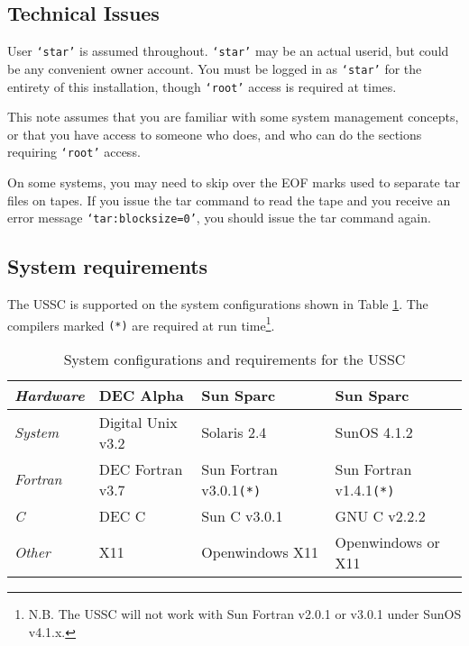 \subsection{Technical Issues}
\label{s:intro:techi}

User {\tt {\tt `star'}} is assumed throughout. {\tt `star'} may be an
actual userid, but could be any convenient owner account.  You must be
logged in as {\tt `star'} for the entirety of this installation, though
{\tt `root'} access is required at times.

This note assumes that you are familiar with some system management concepts,
or that you have access to someone who does, and who can do the sections 
requiring {\tt `root'} access.

On some systems, you may need to skip over the EOF marks used to separate
tar files on tapes.  If you issue the tar command to read the tape and
you receive an error message {\tt `tar:blocksize=0'}, you should issue
the tar command again.

\subsection{System requirements}
\label{s:intro:reqs}

The USSC is supported on the system configurations shown in Table
\ref{t:reqs}. The compilers marked {\tt (*)} are required at run
time\footnote{N.B. The USSC will not work with Sun Fortran
v2.0.1 or v3.0.1 under SunOS v4.1.x.}.

\begin{table}[h]
\begin{small}
\begin{center}
\begin{tabular}{|l||l||l||l|} \hline
{\em Hardware} & DEC Alpha         & Sun Sparc & Sun Sparc \\ \hline
{\em System}   & Digital Unix v3.2 & Solaris 2.4 & SunOS 4.1.2 \\ \hline
{\em Fortran}  & DEC Fortran v3.7  & Sun Fortran v3.0.1{\tt (*)} &
                 Sun Fortran v1.4.1{\tt (*)} \\ \hline
{\em C}        & DEC C             & Sun C v3.0.1 & GNU C v2.2.2 \\ \hline
{\em Other}    & X11 & Openwindows X11 & Openwindows or X11 \\ \hline
\end{tabular}
\caption{System configurations and requirements for the USSC}
\label{t:reqs}
\end{center}
\end{small}
\end{table}


